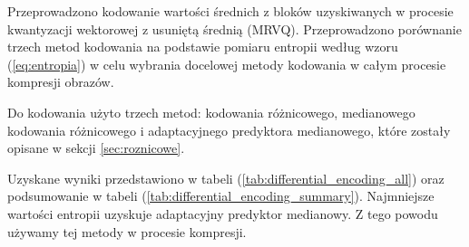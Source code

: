 \documentclass{article}
\begin{document}


Przeprowadzono kodowanie wartości średnich z bloków uzyskiwanych w procesie kwantyzacji wektorowej z usuniętą średnią (MRVQ). Przeprowadzono porównanie trzech metod kodowania na podstawie pomiaru entropii według wzoru (\ref{eq:entropia}) w celu wybrania docelowej metody kodowania w całym procesie kompresji obrazów.

Do kodowania użyto trzech metod: kodowania różnicowego, medianowego kodowania różnicowego i adaptacyjnego predyktora medianowego, które zostały opisane w sekcji \ref{sec:roznicowe}.

Uzyskane wyniki przedstawiono w tabeli (\ref{tab:differential_encoding_all}) oraz podsumowanie w tabeli (\ref{tab:differential_encoding_summary}). Najmniejsze wartości entropii uzyskuje adaptacyjny predyktor medianowy.
Z tego powodu używamy tej metody w procesie kompresji.
\end{document}
